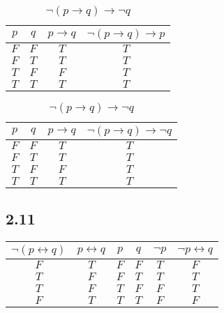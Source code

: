 \documentclass[10pt]{ctexart}
\begin{document}
\begin{table}[h]
\begin{subtable}[h]{2in}
\begin{tabular}{|c|c|c|c|}
                    \hline
                    $p$ & $q$ & $p \rightarrow q$ & $\neg (p \rightarrow q) \rightarrow p$ \\
                    \hline
                    $F$ & $F$ & $T$ & $T$ \\ 
                    \hline
                    $F$ & $T$ & $T$ & $T$ \\ 
                    \hline
                    $T$ & $F$ & $F$ & $T$ \\ 
                    \hline
                    $T$ & $T$ & $T$ & $T$ \\ 
                    \hline
                \end{tabular}
            \end{subtable}
            \begin{subtable}[h]{3.2in}
                \setlength{\abovecaptionskip}{0pt}
                \setlength{\belowcaptionskip}{0pt}
                \centering
                \caption{$\neg (p \rightarrow q) \rightarrow \neg q$}
                \begin{tabular}{|c|c|c|c|}
                    \hline
                    $p$ & $q$ & $p \rightarrow q$ & $\neg (p \rightarrow q) \rightarrow \neg q$ \\
                    \hline
                    $F$ & $F$ & $T$ & $T$ \\ 
                    \hline
                    $F$ & $T$ & $T$ & $T$ \\ 
                    \hline
                    $T$ & $F$ & $F$ & $T$ \\ 
                    \hline
                    $T$ & $T$ & $T$ & $T$ \\ 
                    \hline
                \end{tabular}
            \end{subtable}
        \end{table}

    \subsection*{2.11}
        \begin{table}[h]
            \centering
            \begin{tabular}{|c|c|c|c|c|c|}
                \hline
                $\neg (p \leftrightarrow q)$ & $p \leftrightarrow q$ & $p$ & $q$ & $\neg p$ & $\neg p \leftrightarrow q$ \\
                \hline
                $F$ & $T$ & $F$ & $F$ & $T$ & $F$ \\
                \hline
                $T$ & $F$ & $F$ & $T$ & $T$ & $T$ \\
                \hline
                $T$ & $F$ & $T$ & $F$ & $F$ & $T$ \\
                \hline
                $F$ & $T$ & $T$ & $T$ & $F$ & $F$ \\
                \hline
            \end{tabular}
        \end{table}
\end{document}
